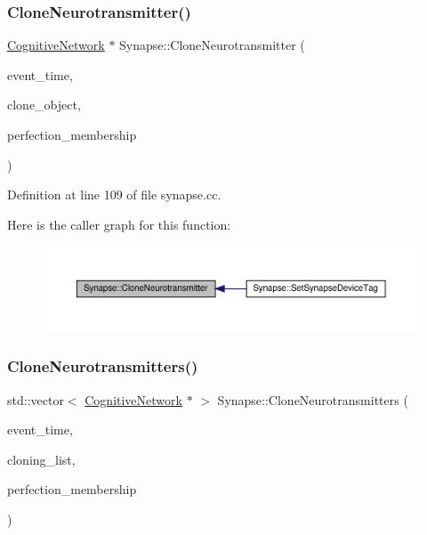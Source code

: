 \subsubsection{\texorpdfstring{Clone\+Neurotransmitter()}{CloneNeurotransmitter()}}
{\footnotesize\ttfamily \hyperlink{class_cognitive_network}{Cognitive\+Network} $\ast$ Synapse\+::\+Clone\+Neurotransmitter (\begin{DoxyParamCaption}\item[{std\+::chrono\+::time\+\_\+point$<$ \hyperlink{universe_8h_a0ef8d951d1ca5ab3cfaf7ab4c7a6fd80}{Clock} $>$}]{event\+\_\+time,  }\item[{\hyperlink{class_cognitive_network}{Cognitive\+Network} $\ast$}]{clone\+\_\+object,  }\item[{double}]{perfection\+\_\+membership }\end{DoxyParamCaption})}



Definition at line 109 of file synapse.\+cc.

Here is the caller graph for this function\+:\nopagebreak
\begin{figure}[H]
\begin{center}
\leavevmode
\includegraphics[width=350pt]{class_synapse_a1b52aa12cc7c28bfa2564e21ac17eb07_icgraph}
\end{center}
\end{figure}
\mbox{\label{class_synapse_a97c0db103754d337e28591f185c8379f}} 
\subsubsection{\texorpdfstring{Clone\+Neurotransmitters()}{CloneNeurotransmitters()}}
{\footnotesize\ttfamily std\+::vector$<$ \hyperlink{class_cognitive_network}{Cognitive\+Network} $\ast$ $>$ Synapse\+::\+Clone\+Neurotransmitters (\begin{DoxyParamCaption}\item[{std\+::chrono\+::time\+\_\+point$<$ \hyperlink{universe_8h_a0ef8d951d1ca5ab3cfaf7ab4c7a6fd80}{Clock} $>$}]{event\+\_\+time,  }\item[{std\+::vector$<$ \hyperlink{class_cognitive_network}{Cognitive\+Network} $\ast$$>$}]{cloning\+\_\+list,  }\item[{double}]{perfection\+\_\+membership }\end{DoxyParamCaption})}



